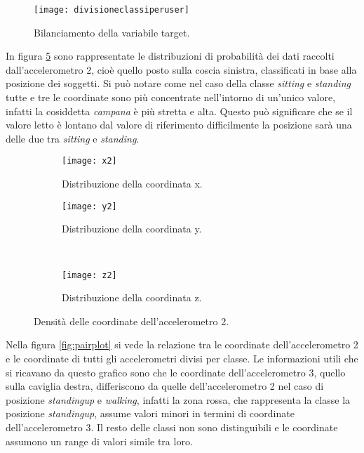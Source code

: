 \begin{figure}[h]
    \centering\texttt{[image: divisioneclassiperuser]}
    \caption{Bilanciamento della variabile target.}
    \label{fig:classiusers}
\end{figure}

In figura \ref{fig:kde} sono rappresentate le distribuzioni di probabilità dei dati raccolti dall'accelerometro 2, cioè quello posto sulla coscia sinistra, classificati in base alla posizione dei soggetti. Si può notare come nel caso della classe \textit{sitting} e \textit{standing} tutte e tre le coordinate sono più concentrate nell'intorno di un'unico valore, infatti la cosiddetta \textit{campana} è più stretta e alta. Questo può significare che se il valore letto è lontano dal valore di riferimento difficilmente la posizione sarà una delle due tra \textit{sitting} e \textit{standing}.

\begin{figure}[h]
    \centering
    \begin{subfigure}[t]{0.4\textwidth}
        \centering\texttt{[image: x2]}
        \caption{Distribuzione della coordinata x.}
        \label{fig:kde:x2}
    \end{subfigure}
    \begin{subfigure}[t]{0.4\textwidth}
        \centering\texttt{[image: y2]}
        \caption{Distribuzione della coordinata y.}
        \label{fig:kde:y2}
    \end{subfigure}
    \\
    \begin{subfigure}[t]{0.4\textwidth}
        \centering\texttt{[image: z2]}
        \caption{Distribuzione della coordinata z.}
        \label{fig:kde:z2}
    \end{subfigure}
    \caption{Densità delle coordinate dell'accelerometro 2.}
    \label{fig:kde}
\end{figure}

Nella figura \ref{fig:pairplot} si vede la relazione tra le coordinate dell'accelerometro 2 e le coordinate di tutti gli accelerometri divisi per classe. Le informazioni utili che si ricavano da questo grafico sono che le coordinate dell'accelerometro 3, quello sulla caviglia destra, differiscono da quelle dell'accelerometro 2 nel caso di posizione \textit{standingup} e \textit{walking}, infatti la zona rossa, che rappresenta la classe la posizione \textit{standingup}, assume valori minori in termini di coordinate dell'accelerometro 3. Il resto delle classi non sono distinguibili e le coordinate assumono un range di valori simile tra loro.

